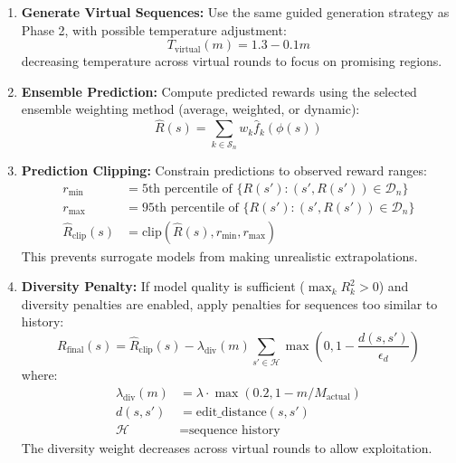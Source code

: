 \documentclass[conference]{IEEEtran}
\begin{document}
\begin{enumerate}
    \item \textbf{Generate Virtual Sequences:} Use the same guided generation strategy as Phase 2, with possible temperature adjustment:
    \begin{equation}
    T_{\text{virtual}}(m) = 1.3 - 0.1m
    \end{equation}
    decreasing temperature across virtual rounds to focus on promising regions.
    
    \item \textbf{Ensemble Prediction:} Compute predicted rewards using the selected ensemble weighting method (average, weighted, or dynamic):
    \begin{equation}
    \hat{R}(s) = \sum_{k \in \mathcal{S}_n} w_k \hat{f}_k(\phi(s))
    \end{equation}
    
    \item \textbf{Prediction Clipping:} Constrain predictions to observed reward ranges:
    \begin{align}
    r_{\min} &= \text{5th percentile of } \{R(s') : (s', R(s')) \in \mathcal{D}_n\} \\
    r_{\max} &= \text{95th percentile of } \{R(s') : (s', R(s')) \in \mathcal{D}_n\} \\
    \hat{R}_{\text{clip}}(s) &= \text{clip}(\hat{R}(s), r_{\min}, r_{\max})
    \end{align}
    This prevents surrogate models from making unrealistic extrapolations.
    
    \item \textbf{Diversity Penalty:} If model quality is sufficient ($\max_k R^2_k > 0$) and diversity penalties are enabled, apply penalties for sequences too similar to history:
    \begin{equation}
    R_{\text{final}}(s) = \hat{R}_{\text{clip}}(s) - \lambda_{\text{div}}(m) \sum_{s' \in \mathcal{H}} \max\left(0, 1 - \frac{d(s, s')}{\epsilon_d}\right)
    \end{equation}
    where:
    \begin{align}
    \lambda_{\text{div}}(m) &= \lambda \cdot \max(0.2, 1 - m/M_{\text{actual}}) \\
    d(s, s') &= \text{edit\_distance}(s, s') \\
    \mathcal{H} &= \text{sequence history}
    \end{align}
    The diversity weight decreases across virtual rounds to allow exploitation.
    

\end{enumerate}
\end{document}
